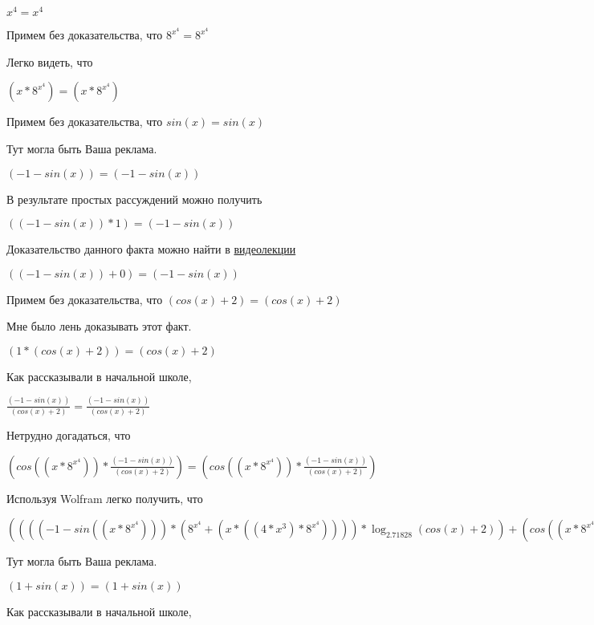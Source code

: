 \documentclass[12pt,a4paper,fleqn]{article}
\theoremstyle{definition}
\begin{document}
${ x }^{ 4 } = { x }^{ 4 }$

Примем без доказательства, что
${ 8 }^{{ x }^{ 4 }} = { 8 }^{{ x }^{ 4 }}$

Легко видеть, что

$( x  * { 8 }^{{ x }^{ 4 }}) = ( x  * { 8 }^{{ x }^{ 4 }})$

Примем без доказательства, что
$sin( x ) = sin( x )$

Тут могла быть Ваша реклама.

$( -1  - sin( x )) = ( -1  - sin( x ))$

В результате простых рассуждений можно получить

$(( -1  - sin( x )) *  1 ) = ( -1  - sin( x ))$

Доказательство данного факта можно найти в \href{https://www.youtube.com/watch?v=dQw4w9WgXcQ}{видеолекции}

$(( -1  - sin( x )) +  0 ) = ( -1  - sin( x ))$

Примем без доказательства, что
$(cos( x ) +  2 ) = (cos( x ) +  2 )$

Мне было лень доказывать этот факт.

$( 1  * (cos( x ) +  2 )) = (cos( x ) +  2 )$

Как рассказывали в начальной школе,

$\frac{( -1  - sin( x ))}{(cos( x ) +  2 )}
 = \frac{( -1  - sin( x ))}{(cos( x ) +  2 )}
$

Нетрудно догадаться, что

$(cos(( x  * { 8 }^{{ x }^{ 4 }})) * \frac{( -1  - sin( x ))}{(cos( x ) +  2 )}
) = (cos(( x  * { 8 }^{{ x }^{ 4 }})) * \frac{( -1  - sin( x ))}{(cos( x ) +  2 )}
)$

Используя Wolfram легко получить, что

$(((( -1  - sin(( x  * { 8 }^{{ x }^{ 4 }}))) * ({ 8 }^{{ x }^{ 4 }} + ( x  * (( 4  * { x }^{ 3 }) * { 8 }^{{ x }^{ 4 }})))) * \log_{ 2.71828 }{(cos( x ) +  2 )}) + (cos(( x  * { 8 }^{{ x }^{ 4 }})) * \frac{( -1  - sin( x ))}{(cos( x ) +  2 )}
)) = (((( -1  - sin(( x  * { 8 }^{{ x }^{ 4 }}))) * ({ 8 }^{{ x }^{ 4 }} + ( x  * (( 4  * { x }^{ 3 }) * { 8 }^{{ x }^{ 4 }})))) * \log_{ 2.71828 }{(cos( x ) +  2 )}) + (cos(( x  * { 8 }^{{ x }^{ 4 }})) * \frac{( -1  - sin( x ))}{(cos( x ) +  2 )}
))$

Тут могла быть Ваша реклама.

$( 1  + sin( x )) = ( 1  + sin( x ))$

Как рассказывали в начальной школе,
\end{document}
